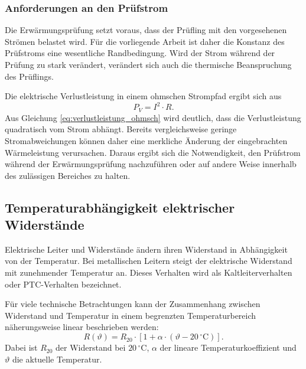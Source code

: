 \subsubsection{Anforderungen an den Prüfstrom}
\label{sec:anforderungen_pruefstrom}

Die Erwärmungsprüfung setzt voraus, dass der Prüfling mit den vorgesehenen Strömen belastet wird. Für die vorliegende Arbeit ist daher die Konstanz des Prüfstroms eine wesentliche Randbedingung. Wird der Strom während der Prüfung zu stark verändert, verändert sich auch die thermische Beanspruchung des Prüflings.

Die elektrische Verlustleistung in einem ohmschen Strompfad ergibt sich aus
\begin{equation}
    P_V = I^2 \cdot R .
    \label{eq:verlustleistung_ohmsch}
\end{equation}
Aus Gleichung \ref{eq:verlustleistung_ohmsch} wird deutlich, dass die Verlustleistung quadratisch vom Strom abhängt. Bereits vergleichsweise geringe Stromabweichungen können daher eine merkliche Änderung der eingebrachten Wärmeleistung verursachen. Daraus ergibt sich die Notwendigkeit, den Prüfstrom während der Erwärmungsprüfung nachzuführen oder auf andere Weise innerhalb des zulässigen Bereiches zu halten.

\subsection{Temperaturabhängigkeit elektrischer Widerstände}
\label{sec:temperaturabhaengigkeit_widerstand}

Elektrische Leiter und Widerstände ändern ihren Widerstand in Abhängigkeit von der Temperatur. Bei metallischen Leitern steigt der elektrische Widerstand mit zunehmender Temperatur an. Dieses Verhalten wird als Kaltleiterverhalten oder PTC-Verhalten bezeichnet.

Für viele technische Betrachtungen kann der Zusammenhang zwischen Widerstand und Temperatur in einem begrenzten Temperaturbereich näherungsweise linear beschrieben werden:
\begin{equation}
    R(\vartheta) = R_{20} \cdot \left[ 1 + \alpha \cdot (\vartheta - 20\,^\circ\mathrm{C}) \right].
    \label{eq:ptc_widerstand}
\end{equation}
Dabei ist $R_{20}$ der Widerstand bei $20\,^\circ\mathrm{C}$, $\alpha$ der lineare Temperaturkoeffizient und $\vartheta$ die aktuelle Temperatur.

